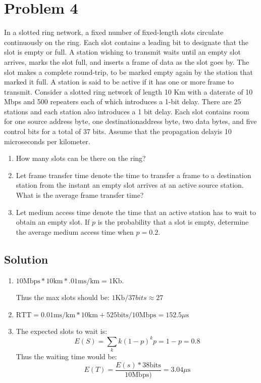 
\section*{Problem 4}

In a slotted ring network, a fixed number of fixed-length slots circulate continuously on the ring.
Each slot contains a leading bit to designate that the slot is empty or full.
A station wishing to transmit waits until an empty slot arrives, marks the slot full, and inserts a frame of data as the slot goes by.
The slot makes a complete round-trip, to be marked empty again by the station that marked it full.
A station is said to be active if it has one or more frame to transmit.
Consider a slotted ring network of length 10 Km with a daterate of 10 Mbps and 500 repeaters each of which introduces a 1-bit delay.
There are 25 stations and each station also introduces a 1 bit delay.
Each slot contains room for one source address byte, one destinationaddress byte, two data bytes, and five control bits for a total of 37 bits.
Assume that the propagation delayis 10 microseconds per kilometer.

\begin{enumerate}
    \item How many slots can be there on the ring?
    \item Let frame transfer time denote the time to transfer a frame to a destination station from the instant an empty slot arrives at an active source station. What is the average frame transfer time?
    \item Let medium access time denote the time that an active station has to wait to obtain an empty slot.
          If $p$ is the probability that a slot is empty, determine the average medium access time when $p = 0.2$.
\end{enumerate}

\subsection*{Solution}

\begin{enumerate}
    \item $ 10 \text{Mbps} * 10 \text{km} * .01 \text{ms/km} = 1 \text{Kb}$.

          Thus the max slots should be: $1 \text{Kb} / 37 bits \approx 27$

    \item $\text{RTT} = 0.01 \text{ms/km} * 10 \text{km} + 525 \text{bits} / 10 \text{Mbps} = 152.5 \mu\text{s}$

    \item The expected slots to wait is:
          $$ E(S) = \sum_k k(1-p)^kp = 1-p = 0.8 $$
          Thus the waiting time would be:
          $$E(T) = \frac{E(s) * 38 \text{bits}}{10\text{Mbps})} = 3.04 \mu\text{s}$$
\end{enumerate}